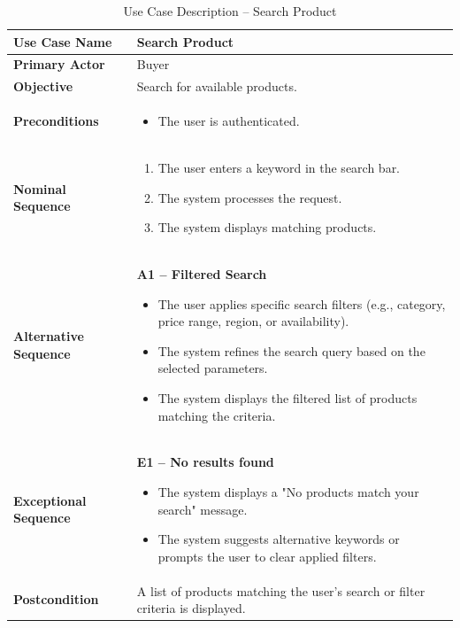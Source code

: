\begin{table}[H]
	\centering
	\renewcommand{\arraystretch}{1.3}
	\begin{tabular}{|p{4cm}|p{10cm}|}
		\hline
		
		\textbf{Use Case Name} & Search Product \\ 
		\hline
		
		\textbf{Primary Actor} & Buyer \\ 
		\hline
		
		\textbf{Objective} & Search for available products. \\ 
		\hline
		
		\textbf{Preconditions} & \begin{itemize}
			\item The user is authenticated.
		\end{itemize}  \\ 
		\hline
		
		\textbf{Nominal Sequence} &
		\begin{enumerate}
			\item The user enters a keyword in the search bar.
			\item The system processes the request.
			\item The system displays matching products.
		\end{enumerate} \\ 
		\hline
		
		\textbf{Alternative Sequence} & 
		\textbf{A1 -- Filtered Search}
		\begin{itemize}
			\item The user applies specific search filters (e.g., category, price range, region, or availability).
			\item The system refines the search query based on the selected parameters.
			\item The system displays the filtered list of products matching the criteria.
		\end{itemize} \\ 
		\hline
		
		\textbf{Exceptional Sequence} &
		\textbf{E1 -- No results found}
		\begin{itemize}
			\item The system displays a "No products match your search" message.
			\item The system suggests alternative keywords or prompts the user to clear applied filters.
		\end{itemize} \\ 
		\hline
		
		\textbf{Postcondition} &
		A list of products matching the user's search or filter criteria is displayed. \\ 
		\hline
		
	\end{tabular}
	\caption{Use Case Description -- Search Product}
\end{table}

